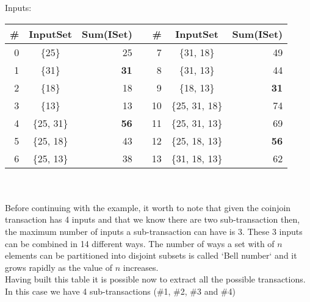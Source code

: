 \documentclass[10pt]{article}
\begin{document}
Inputs:

\begin{tabular}{| r | c | r | l | r | c | r |}
  \hline			
  \# & InputSet & Sum(ISet) & & \# & InputSet & Sum(ISet) \\
  \hline
  0 & \{25\} & 25 & & 7 & \{31, 18\} & 49 \\
  1 & \{31\} & \textbf{31} & & 8 & \{31, 13\} & 44 \\
  2 & \{18\} & 18 & & 9 & \{18, 13\} & \textbf{31} \\
  3 & \{13\} & 13 & & 10 & \{25, 31, 18\} & 74 \\
  4 & \{25, 31\} & \textbf{56} & & 11 & \{25, 31, 13\} & 69 \\
  5 & \{25, 18\} & 43 & & 12 & \{25, 18, 13\} & \textbf{56} \\
  6 & \{25, 13\} & 38 & & 13 & \{31, 18, 13\} & 62 \\
  \hline  
\end{tabular}\\\\


Before continuing with the example, it worth to note that given the coinjoin transaction has 4 inputs and that we know there are two sub-transaction then, the maximum number of inputs a sub-transaction can have is 3. These 3 inputs can be combined in 14 different ways.
The number of ways a set with of $n$ elements can be partitioned into disjoint subsets is called `Bell number` and it grows rapidly as the value of $n$ increases. \\

Having built this table it is possible now to extract all the possible transactions. In this case we have 4 sub-transactions (\#1, \#2, \#3 and \#4)


\begin{center}
\end{center}
\end{document}
